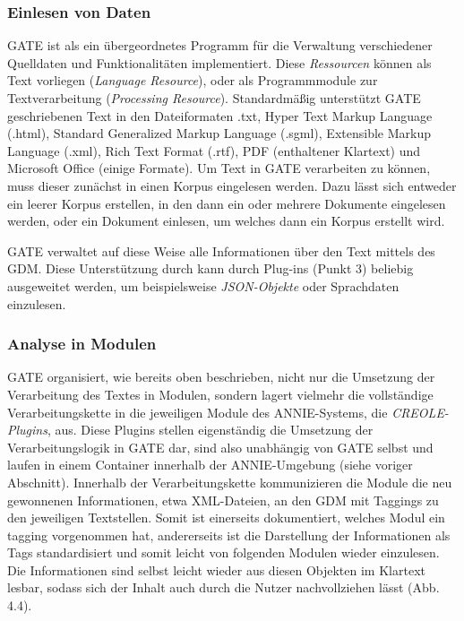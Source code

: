 \documentclass[12pt]{report}
\begin{document}
\subsubsection{Einlesen von Daten}
GATE ist als ein übergeordnetes Programm für die Verwaltung verschiedener Quelldaten und Funktionalitäten implementiert. Diese \textit{Ressourcen} können als Text vorliegen (\textit{Language Resource}), oder als Programmmodule zur Textverarbeitung (\textit{Processing Resource}). Standardmäßig unterstützt GATE geschriebenen Text in den Dateiformaten .txt, Hyper Text Markup Language (.html), Standard Generalized Markup Language (.sgml), Extensible Markup Language (.xml), Rich Text Format (.rtf), PDF (enthaltener Klartext) und Microsoft Office (einige Formate). Um Text in GATE verarbeiten zu können, muss dieser zunächst in einen Korpus eingelesen werden. Dazu lässt sich entweder ein leerer Korpus erstellen, in den dann ein oder mehrere Dokumente eingelesen werden, oder ein Dokument einlesen, um welches dann ein Korpus erstellt wird. 

GATE verwaltet auf diese Weise alle Informationen über den Text mittels des GDM. Diese Unterstützung durch kann durch Plug-ins (Punkt 3) beliebig ausgeweitet werden, um beispielsweise \textit{JSON-Objekte} oder Sprachdaten einzulesen.

\subsubsection{Analyse in Modulen}
GATE organisiert, wie bereits oben beschrieben, nicht nur die Umsetzung der Verarbeitung des Textes in Modulen, sondern lagert vielmehr die vollständige Verarbeitungskette in die jeweiligen Module des ANNIE-Systems, die \textit{CREOLE-Plugins}, aus. Diese Plugins stellen eigenständig die Umsetzung der Verarbeitungslogik in GATE dar, sind also unabhängig von GATE selbst und laufen in einem Container innerhalb der ANNIE-Umgebung (siehe voriger Abschnitt). Innerhalb der Verarbeitungskette kommunizieren die Module die neu gewonnenen Informationen, etwa XML-Dateien, an den GDM mit Taggings zu den jeweiligen Textstellen. Somit ist einerseits dokumentiert, welches Modul ein tagging vorgenommen hat,  andererseits ist die Darstellung der Informationen als Tags standardisiert und somit leicht von folgenden Modulen wieder einzulesen. Die Informationen sind selbst leicht wieder aus diesen Objekten im Klartext lesbar, sodass sich der Inhalt auch durch die Nutzer nachvollziehen lässt (Abb. 4.4).
\end{document}
